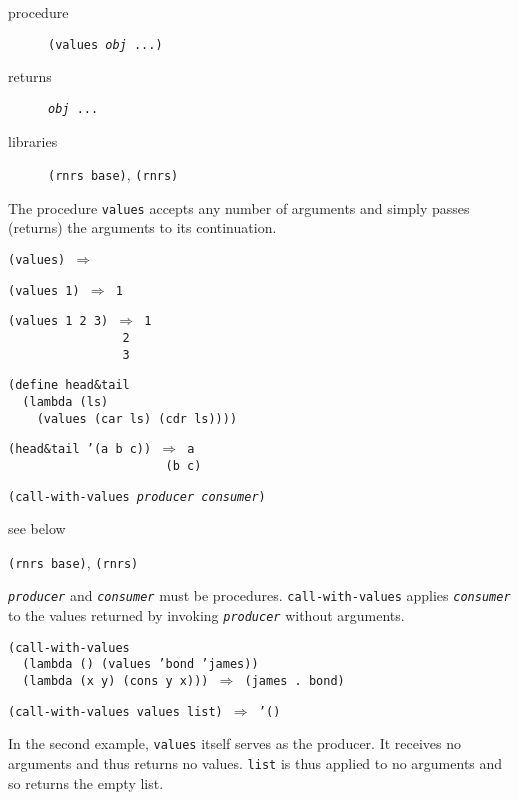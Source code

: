 \begin{description}

\label{control_s70}\item[procedure] \texttt{(values \textit{obj} ...)}



\item[returns] \texttt{\textit{obj} ...}


\item[libraries] \texttt{(rnrs base)}, \texttt{(rnrs)}
\end{description}


The procedure \texttt{values} accepts any number of arguments and
simply passes (returns) the arguments to its continuation.


\begin{alltt}
(values) \(\Rightarrow\)

(values 1) \(\Rightarrow\) 1

(values 1 2 3) \(\Rightarrow\) 1
                2
                3

(define head\&{}tail
  (lambda (ls)
    (values (car ls) (cdr ls))))

(head\&{}tail '(a b c)) \(\Rightarrow\) a
                      (b c)
\end{alltt}

\begin{description}

\label{control_s71}\item[procedure] \texttt{(call-with-values \textit{producer} \textit{consumer})}



\item[returns] see below


\item[libraries] \texttt{(rnrs base)}, \texttt{(rnrs)}
\end{description}

\texttt{\textit{producer}} and \texttt{\textit{consumer}} must be procedures.
\texttt{call-with-values} applies \texttt{\textit{consumer}} to the values
returned by invoking \texttt{\textit{producer}} without arguments.

\begin{alltt}
(call-with-values
  (lambda () (values 'bond 'james))
  (lambda (x y) (cons y x))) \(\Rightarrow\) (james . bond)

(call-with-values values list) \(\Rightarrow\) '()
\end{alltt}


In the second example, \texttt{values} itself serves as the producer.
It receives no arguments and thus returns no values.
\texttt{list} is thus applied to no arguments and so returns the
empty list.


